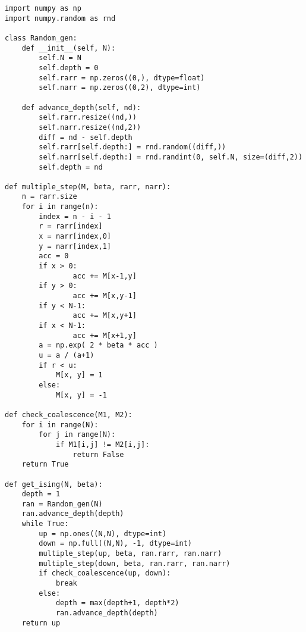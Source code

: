 \documentclass[]{marticle}
\begin{document}
\begin{lstlisting}
import numpy as np
import numpy.random as rnd

class Random_gen:
    def __init__(self, N):
        self.N = N
        self.depth = 0
        self.rarr = np.zeros((0,), dtype=float)
        self.narr = np.zeros((0,2), dtype=int)

    def advance_depth(self, nd):
        self.rarr.resize((nd,))
        self.narr.resize((nd,2))
        diff = nd - self.depth
        self.rarr[self.depth:] = rnd.random((diff,))
        self.narr[self.depth:] = rnd.randint(0, self.N, size=(diff,2))
        self.depth = nd

def multiple_step(M, beta, rarr, narr):
    n = rarr.size
    for i in range(n):
        index = n - i - 1
        r = rarr[index]
        x = narr[index,0]
        y = narr[index,1]
        acc = 0
        if x > 0:
                acc += M[x-1,y]
        if y > 0:
                acc += M[x,y-1]
        if y < N-1:
                acc += M[x,y+1]
        if x < N-1:
                acc += M[x+1,y]
        a = np.exp( 2 * beta * acc )
        u = a / (a+1)
        if r < u:
            M[x, y] = 1
        else:
            M[x, y] = -1

def check_coalescence(M1, M2):
    for i in range(N):
        for j in range(N):
            if M1[i,j] != M2[i,j]:
                return False
    return True

def get_ising(N, beta):
    depth = 1
    ran = Random_gen(N)
    ran.advance_depth(depth)
    while True:
        up = np.ones((N,N), dtype=int)
        down = np.full((N,N), -1, dtype=int)
        multiple_step(up, beta, ran.rarr, ran.narr)
        multiple_step(down, beta, ran.rarr, ran.narr)
        if check_coalescence(up, down):
            break
        else:
            depth = max(depth+1, depth*2)
            ran.advance_depth(depth)
    return up
\end{lstlisting}
\end{document}
